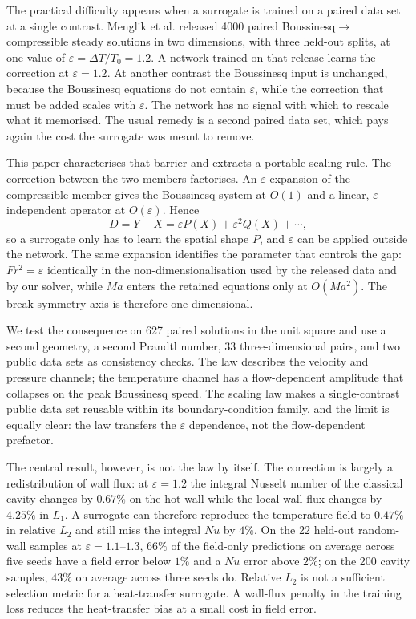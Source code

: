\documentclass[preprint,11pt,a4paper,times]{elsarticle}
\begin{document}
The practical difficulty appears when a surrogate is trained on a paired data set at a single
contrast. Menglik et al. \citep{menglik2026neural} released 4000 paired
Boussinesq$\to$compressible steady
solutions in two dimensions, with three held-out splits, at one value of
$\varepsilon=\Delta T/T_0=1.2$. A network trained on that release learns the correction at
$\varepsilon=1.2$. At another contrast the Boussinesq input is unchanged, because the
Boussinesq equations do not contain $\varepsilon$, while the correction that must be added
scales with $\varepsilon$. The network has no signal with which to rescale what it memorised.
The usual remedy is a second paired data set, which pays again the cost the surrogate was meant
to remove.

This paper characterises that barrier and extracts a portable scaling rule. The correction
between the two members factorises. An
$\varepsilon$-expansion of the compressible member gives the Boussinesq system at $O(1)$ and a
linear, $\varepsilon$-independent operator at $O(\varepsilon)$. Hence
\begin{equation}
  D=Y-X=\varepsilon P(X)+\varepsilon^2 Q(X)+\cdots,
  \label{eq:factor}
\end{equation}
so a surrogate only has to learn the spatial shape $P$, and $\varepsilon$ can be applied
outside the network. The same expansion identifies the parameter that controls the gap:
$Fr^2=\varepsilon$ identically in the non-dimensionalisation used by the released data and by
our solver, while $Ma$ enters the retained equations only at $O(Ma^2)$. The break-symmetry
axis is therefore one-dimensional.

We test the consequence on 627 paired solutions in the unit square and use a second geometry, a
second Prandtl number, 33 three-dimensional pairs, and two public data sets as consistency
checks. The law describes the velocity and pressure channels; the temperature channel has a
flow-dependent amplitude that collapses on the peak Boussinesq speed. The scaling law makes a
single-contrast public data set reusable within its boundary-condition family, and the limit
is equally clear: the law transfers the $\varepsilon$ dependence, not the flow-dependent
prefactor.

The central result, however, is not the law by itself. The correction is largely a
redistribution of wall flux: at $\varepsilon=1.2$ the integral Nusselt number of the classical
cavity changes by $0.67\%$ on the hot wall while the local wall flux changes by $4.25\%$ in $L_1$. A surrogate
can therefore reproduce the temperature field to $0.47\%$ in relative $L_2$ and still miss the
integral $Nu$ by $4\%$. On the 22 held-out random-wall samples at $\varepsilon=1.1$--$1.3$,
$66\%$ of the field-only predictions on average across five seeds have a field error below $1\%$
and a $Nu$ error above $2\%$; on the 200 cavity samples, $43\%$ on average across three seeds
do. Relative $L_2$ is
not a sufficient selection metric for a heat-transfer surrogate. A wall-flux penalty in the
training loss reduces the heat-transfer bias at a small cost in field error.
\end{document}
